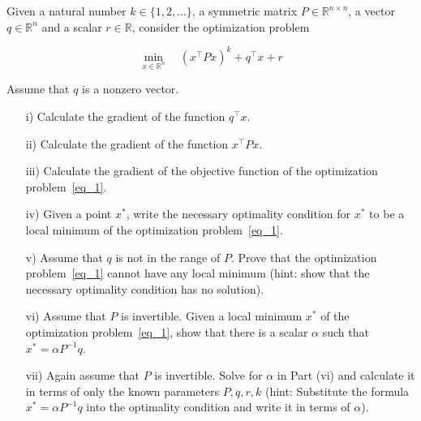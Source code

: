 \begin{homeworkProblem}
    
Given a natural number $k \in \{1, 2, \ldots\}$, a symmetric matrix 
$P\in\mathbb R^{n\times n}$, a vector $q\in\mathbb R^n$ and a scalar 
$r\in\mathbb R$, consider the optimization problem

    \begin{equation}
        \label{eq_1}
        \min_{x\in\mathbb R^n} \quad (x^\top P x)^k + q^\top x + r 
    \end{equation}
    
    Assume that $q$ is a nonzero vector. 
    \begin{itemize}
        \item [i)] Calculate the gradient of the function $q^\top x$.
        \item [ii)] Calculate the gradient of the function $x^\top P x$.
        \item [iii)] Calculate the gradient of the objective function of the 
            optimization problem~\eqref{eq_1}.
        \item [iv)] Given a point $x^*$, write the necessary optimality 
            condition for $x^*$ to be a local minimum of the optimization 
            problem~\eqref{eq_1}.
        \item [v)] Assume that $q$ is not in the range of $P$. Prove that the 
            optimization problem~\eqref{eq_1} cannot have any local minimum 
            (hint: show that the necessary optimality condition has no solution).
        \item [vi)] Assume that $P$ is invertible. Given a  local minimum $x^*$ 
            of the optimization problem~\eqref{eq_1}, show that there is a 
            scalar $\alpha$ such that $x^*=\alpha P^{-1}q$. 
        \item [vii)] Again assume that $P$ is invertible. Solve for $\alpha$ in 
            Part (vi) and calculate it in terms of only the known parameters 
            $P,q,r,k$ (hint: Substitute the formula $x^*=\alpha P^{-1}q$ into 
            the optimality condition and write it in terms of $\alpha$). 
    \end{itemize}


\end{homeworkProblem}
